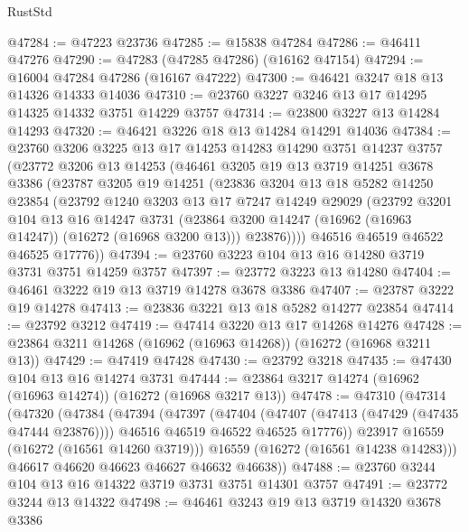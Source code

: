 \begin{lexlean}{RustStd}
\begin{coremodule}
@47284 := @47223 @23736
@47285 := @15838 @47284
@47286 := @46411 @47276
@47290 := @47283 (@47285 @47286) (@16162 @47154)
@47294 := @16004 @47284 @47286 (@16167 @47222)
@47300 := @46421 @3247 @18 @13 @14326 @14333 @14036
@47310 := @23760 @3227 @3246 @13 @17 @14295 @14325 @14332 @3751 @14229 @3757
@47314 := @23800 @3227 @13 @14284 @14293
@47320 := @46421 @3226 @18 @13 @14284 @14291 @14036
@47384 := @23760
    @3206
    @3225
    @13
    @17
    @14253
    @14283
    @14290
    @3751
    @14237
    @3757
    (@23772
      @3206
      @13
      @14253
      (@46461
        @3205
        @19
        @13
        @3719
        @14251
        @3678
        @3386
        (@23787
          @3205
          @19
          @14251
          (@23836
            @3204
            @13
            @18
            @5282
            @14250
            @23854
            (@23792
              @1240
              @3203
              @13
              @17
              @7247
              @14249
              @29029
              (@23792
                @3201
                @104
                @13
                @16
                @14247
                @3731
                (@23864 @3200 @14247 (@16962 (@16963 @14247)) (@16272 (@16968 @3200 @13)))
                @23876))))
        @46516
        @46519
        @46522
        @46525
        @17776))
@47394 := @23760 @3223 @104 @13 @16 @14280 @3719 @3731 @3751 @14259 @3757
@47397 := @23772 @3223 @13 @14280
@47404 := @46461 @3222 @19 @13 @3719 @14278 @3678 @3386
@47407 := @23787 @3222 @19 @14278
@47413 := @23836 @3221 @13 @18 @5282 @14277 @23854
@47414 := @23792 @3212
@47419 := @47414 @3220 @13 @17 @14268 @14276
@47428 := @23864 @3211 @14268 (@16962 (@16963 @14268)) (@16272 (@16968 @3211 @13))
@47429 := @47419 @47428
@47430 := @23792 @3218
@47435 := @47430 @104 @13 @16 @14274 @3731
@47444 := @23864 @3217 @14274 (@16962 (@16963 @14274)) (@16272 (@16968 @3217 @13))
@47478 := @47310
    (@47314
      (@47320
        (@47384
          (@47394
            (@47397
              (@47404
                (@47407 (@47413 (@47429 (@47435 @47444 @23876))))
                @46516
                @46519
                @46522
                @46525
                @17776))
            @23917
            @16559
            (@16272 (@16561 @14260 @3719)))
          @16559
          (@16272 (@16561 @14238 @14283)))
        @46617
        @46620
        @46623
        @46627
        @46632
        @46638))
@47488 := @23760 @3244 @104 @13 @16 @14322 @3719 @3731 @3751 @14301 @3757
@47491 := @23772 @3244 @13 @14322
@47498 := @46461 @3243 @19 @13 @3719 @14320 @3678 @3386

\end{coremodule}
\end{lexlean}
